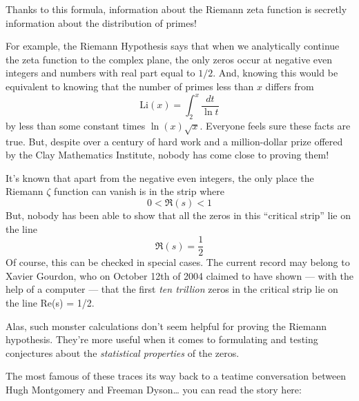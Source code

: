 \documentclass{article}
\def\tightlist{}
\renewcommand{\texttt}[1]{%
  \begingroup
  \ttfamily
  \begingroup\lccode`~=`/\lowercase{\endgroup\def~}{/\discretionary{}{}{}}%
  \begingroup\lccode`~=`[\lowercase{\endgroup\def~}{[\discretionary{}{}{}}%
  \begingroup\lccode`~=`.\lowercase{\endgroup\def~}{.\discretionary{}{}{}}%
  \catcode`/=\active\catcode`[=\active\catcode`.=\active
  \scantokens{#1\noexpand}%
  \endgroup
}
\begin{document}
Thanks to this formula, information about the Riemann zeta function is
secretly information about the distribution of primes!

For example, the Riemann Hypothesis says that when we analytically
continue the zeta function to the complex plane, the only zeros occur at
negative even integers and numbers with real part equal to \(1/2\). And,
knowing this would be equivalent to knowing that the number of primes
less than \(x\) differs from
\[\mathrm{Li}(x) = \int_2^x \frac{dt}{\ln t}\] by less than some
constant times \(\ln(x)\sqrt{x}\). Everyone feels sure these facts are
true. But, despite over a century of hard work and a million-dollar
prize offered by the Clay Mathematics Institute, nobody has come close
to proving them!

It's known that apart from the negative even integers, the only place
the Riemann \(\zeta\) function can vanish is in the strip where
\[0 < \Re(s) < 1\] But, nobody has been able to show that all the zeros
in this ``critical strip'' lie on the line \[\Re(s) = \frac12\] Of
course, this can be checked in special cases. The current record may
belong to Xavier Gourdon, who on October 12th of 2004 claimed to have
shown --- with the help of a computer --- that the first \emph{ten
trillion} zeros in the critical strip lie on the line Re(s) = 1/2.


Alas, such monster calculations don't seem helpful for proving the
Riemann hypothesis. They're more useful when it comes to formulating and
testing conjectures about the \emph{statistical properties} of the
zeros.

The most famous of these traces its way back to a teatime conversation
between Hugh Montgomery and Freeman Dyson\ldots{} you can read the story
here:

\end{document}
